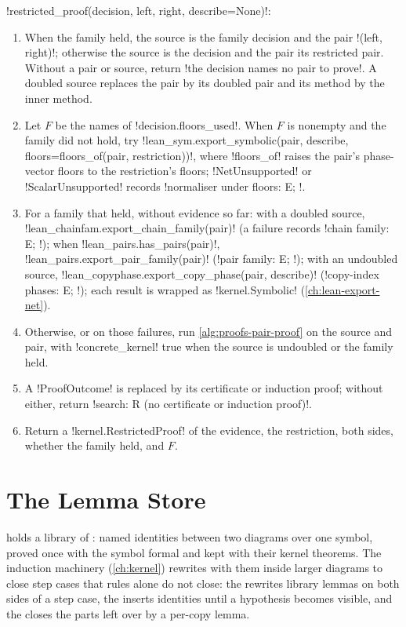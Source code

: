 \begin{algorithm}\label{alg:proofs-restricted-proof}
\py!restricted_proof(decision, left, right, describe=None)!:
\begin{enumerate}
\item When the family held, the source is the family decision and the pair \py!(left, right)!; otherwise the source is the decision and the pair its restricted pair. Without a pair or source, return \code!the decision names no pair to prove!. A doubled source replaces the pair by its doubled pair and its method by the inner method.
\item Let $F$ be the names of \py!decision.floors_used!. When $F$ is nonempty and the family did not hold, try \py!lean_sym.export_symbolic(pair, describe, floors=floors_of(pair, restriction))!, where \py!floors_of! raises the pair's phase-vector floors to the restriction's floors; \py!NetUnsupported! or \py!ScalarUnsupported! records \code!normaliser under floors: E; !.
\item For a family that held, without evidence so far: with a doubled source, \py!lean_chainfam.export_chain_family(pair)! (a failure records \code!chain family: E; !); when \py!lean_pairs.has_pairs(pair)!, \py!lean_pairs.export_pair_family(pair)! (\code!pair family: E; !); with an undoubled source, \py!lean_copyphase.export_copy_phase(pair, describe)! (\code!copy-index phases: E; !); each result is wrapped as \py!kernel.Symbolic! (\cref{ch:lean-export-net}).
\item Otherwise, or on those failures, run \cref{alg:proofs-pair-proof} on the source and pair, with \py!concrete_kernel! true when the source is undoubled or the family held.
\item A \py!ProofOutcome! is replaced by its certificate or induction proof; without either, return \code!search: R (no certificate or induction proof)!.
\item Return a \py!kernel.RestrictedProof! of the evidence, the restriction, both sides, whether the family held, and $F$.
\end{enumerate}
\end{algorithm}

\section{The Lemma Store}\label{sec:proofs-lemmas}

 holds a library of : named identities between two diagrams over one symbol, proved once with the symbol formal and kept with their kernel theorems. The induction machinery (\cref{ch:kernel}) rewrites with them inside larger diagrams to close step cases that rules alone do not close: the  rewrites library lemmas on both sides of a step case, the  inserts identities until a hypothesis becomes visible, and the  closes the parts left over by a per-copy lemma.

